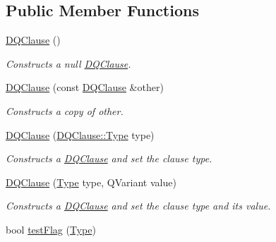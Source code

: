 \subsection*{Public Member Functions}
\begin{DoxyCompactItemize}
\item 
\hyperlink{classDQClause_ae882c0d88fc37dc01c016a0ceeffbe8a}{DQClause} ()
\begin{DoxyCompactList}\small\item\em Constructs a null \hyperlink{classDQClause}{DQClause}. \item\end{DoxyCompactList}\item 
\hypertarget{classDQClause_a56478f6b405a3bde8fa0e638b68d9931}{
\hyperlink{classDQClause_a56478f6b405a3bde8fa0e638b68d9931}{DQClause} (const \hyperlink{classDQClause}{DQClause} \&other)}
\label{classDQClause_a56478f6b405a3bde8fa0e638b68d9931}

\begin{DoxyCompactList}\small\item\em Constructs a copy of other. \item\end{DoxyCompactList}\item 
\hypertarget{classDQClause_a33812fcf3fb2535d0e04c49c96652bc4}{
\hyperlink{classDQClause_a33812fcf3fb2535d0e04c49c96652bc4}{DQClause} (\hyperlink{classDQClause_a8cbc814ce3412035fbaa066b20689fe3}{DQClause::Type} type)}
\label{classDQClause_a33812fcf3fb2535d0e04c49c96652bc4}

\begin{DoxyCompactList}\small\item\em Constructs a \hyperlink{classDQClause}{DQClause} and set the clause type. \item\end{DoxyCompactList}\item 
\hypertarget{classDQClause_aabb39dd73ec1547113e21c2cdf4533df}{
\hyperlink{classDQClause_aabb39dd73ec1547113e21c2cdf4533df}{DQClause} (\hyperlink{classDQClause_a8cbc814ce3412035fbaa066b20689fe3}{Type} type, QVariant value)}
\label{classDQClause_aabb39dd73ec1547113e21c2cdf4533df}

\begin{DoxyCompactList}\small\item\em Constructs a \hyperlink{classDQClause}{DQClause} and set the clause type and its value. \item\end{DoxyCompactList}\item 
\hypertarget{classDQClause_a49f02542c1958181e10b455fc1cc7213}{
bool \hyperlink{classDQClause_a49f02542c1958181e10b455fc1cc7213}{testFlag} (\hyperlink{classDQClause_a8cbc814ce3412035fbaa066b20689fe3}{Type})}
\label{classDQClause_a49f02542c1958181e10b455fc1cc7213}


\end{DoxyCompactItemize}
